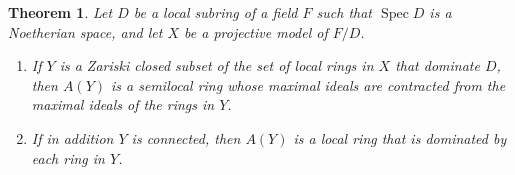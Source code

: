 \documentclass[preprint, 11pt,nonatbib]{elsarticle}
\DeclareMathOperator{\Spec}{Spec}
\newtheorem{theorem}{Theorem}
\theoremstyle{definition}
\numberwithin{theorem}{section}
\begin{document}
\begin{theorem} \label{proj case} 
Let $D$ be a local subring of a field $F$ such that $\Spec D$ is a Noetherian space, and let $X$ be a projective model of $F/D$.
\begin {enumerate}
\item[$(1)$]
If $Y$ is a Zariski closed subset of the set of local rings in $X$ that dominate $D$, then $A(Y)$ is a semilocal ring whose maximal ideals are contracted from the maximal ideals of the rings in $Y$.  
\item[$(2)$]
If in addition  $Y$ is connected,  then $A({Y})$ is a   local   ring that is dominated by each ring in $Y$. %
\end{enumerate}
\end{theorem}
\end{document}
